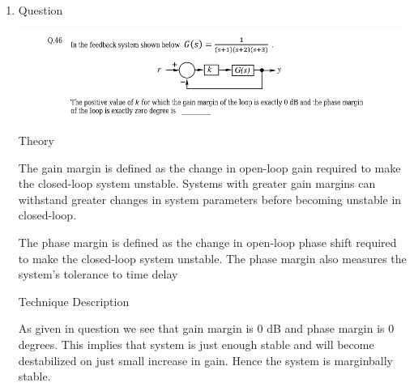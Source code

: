 \begin{enumerate}[label=\thesection.\arabic*.,ref=\thesection.\theenumi]

\item

\begin{frame}{Question}
\begin{block}

\includegraphics[scale=0.4]{1.png}

\end{block}
\end{frame}

\begin{frame}{Theory}

\begin{block}

The gain margin is defined as the change in open-loop gain required to make the closed-loop system unstable. Systems with greater gain margins can withstand greater changes in system parameters before becoming unstable in closed-loop. 

\end{block} \vspace{16pt}
\begin{block}

The phase margin is defined as the change in open-loop phase shift required to make the closed-loop system unstable. The phase margin also measures the system's tolerance to time delay
\end{block} \vspace{16pt}




\end{frame}



\begin{frame}{Technique Description}
\begin{block}

As given in question we see that gain margin is 0 dB and phase margin is 0 degrees. This implies that system is just enough stable and will become destabilized on just small increase in gain. Hence the system is marginbally stable.
\end{block}
\end{frame}
\begin{frame}
\begin{block}



\end{block}
\end{frame}
\end{enumerate}

